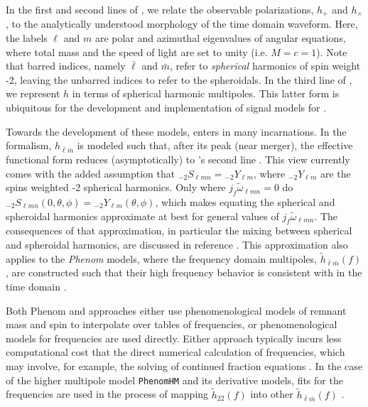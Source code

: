 \documentclass[twocolumn,aps,prd,floatfix,preprintnumbers,a4paper,nofootinbib,
superscriptaddress,10pt]{revtex4-1}
\newcommand{\cw}{\tilde{\omega}}
\def\jf{j_f}
\def\lmn{_{\ell m n}}
\def\LM{_{\bar{\ell} \bar{m}}}
\begin{document}
%
\par In the first and second lines of , we relate the observable \gw{} polarizations, $h_+$ and $h_\times$, to the analytically understood morphology of the time domain \rd{} waveform.
%
Here, the labels $\ell$ and $m$ are polar and azimuthal eigenvalues of  angular equations, where total mass and the speed of light are set to unity (i.e. $M=c=1$).
%
Note that barred indices, namely $\bar{\ell}$ and $\bar{m}$, refer to \textit{spherical} harmonics of spin weight -2, leaving the unbarred indices to refer to the spheroidals.
%
In the third line of , we represent $h$ in terms of {spherical} harmonic multipoles.
%
This latter form is ubiquitous for the development and implementation of \imr{} signal models for .
%
%
\par Towards the development of these models,  enters in many incarnations.
%
In the \eob{} formalism, $h\LM$ is modeled such that, after its peak (near merger), the effective functional form reduces (asymptotically) to 's second line \cite{Cotesta:2018fcv, Buonanno:2000ef,
Bohe:2016gbl,Pan:2013rra, Bohe:2016gbl, Nagar:2018zoe}.
%
This view currently comes with the added assumption that ${_{-2}}S_{\ell m n} = {_{-2}}Y_{\ell m}$, where ${_{-2}}Y_{\ell m}$ are the spins weighted -2 spherical harmonics.
%
Only where $\jf \cw\lmn=0$ do $_{-2}S\lmn( 0,\theta,\phi) = {_{-2}}Y_{\ell m}(\theta,\phi)$, which makes equating the spherical and spheroidal harmonics approximate at best for general values of $\jf \cw\lmn$.
%
The consequences of that approximation, in particular the mixing between spherical and spheroidal harmonics, are discussed in reference \cite{London:2014cma,Berti:2014fga,London:2018gaq,Kelly:2012nd}.
%
This approximation also applies to the \textit{Phenom} models,
where the frequency domain multipoles, $\tilde{h}\LM(f)$, are constructed such that their high frequency behavior is consistent with  in the time domain
%
\cite{Hannam:2013oca, London:2017bcn, Khan:2015jqa, Schmidt:2014iyl, Mehta:2017jpq,Khan:2018fmp}.
%
\par Both Phenom and \eob{} approaches either use phenomenological models of remnant \bh{} mass and spin to interpolate over tables of \qnm{} frequencies, or phenomenological models for \qnm{} frequencies are used directly.
%
Either approach typically incurs less computational cost that the direct numerical calculation of \qnm{} frequencies, which may involve, for example, the solving of continued fraction equations \cite{Leaver85}.
%
In the case of the higher multipole model \texttt{PhenomHM} and its derivative models, fits for the \qnm{} frequencies are used in the process of mapping $\tilde{h}_{22}(f)$ into other $\tilde{h}\LM(f)$ \cite{London:2017bcn}.
\end{document}
